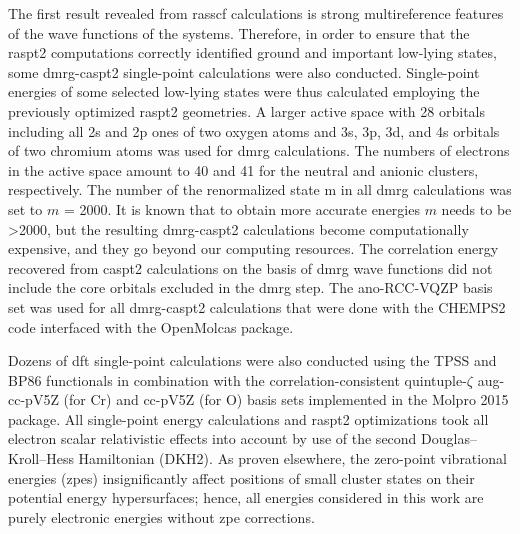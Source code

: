 \begin{refsection}
The first result revealed from \acrshort{rasscf} calculations is strong multireference features of the wave functions of the  systems. Therefore, in order to ensure that the \acrshort{raspt2} computations correctly identified ground and important low-lying states, some \acrshort{dmrg}-\acrshort{caspt2} \cite{dmrg1, dmrg2, dmrg3, dmrg4, dmrg5} single-point calculations were also conducted. Single-point energies of some selected low-lying states were thus calculated employing the previously optimized \acrshort{raspt2} geometries. A larger active space with 28 orbitals including all 2s and 2p ones of two oxygen atoms and 3s, 3p, 3d, and 4s orbitals of two chromium atoms was used for \acrshort{dmrg} calculations. The numbers of electrons in the active space amount to 40 and 41 for the neutral and anionic clusters, respectively. The number of the renormalized state m in all \acrshort{dmrg} calculations was set to $m$ = 2000. It is known that to obtain more accurate energies $m$ needs to be >2000, but the resulting \acrshort{dmrg}-\acrshort{caspt2} calculations become computationally expensive, and they go beyond our computing resources. The correlation energy recovered from \acrshort{caspt2} calculations on the basis of \acrshort{dmrg} wave functions did not include the core orbitals excluded in the \acrshort{dmrg} step. The \acrshort{ano}-RCC-VQZP basis set was used for all \acrshort{dmrg}-\acrshort{caspt2} calculations that were done with the CHEMPS2 code\cite{chemps2} interfaced with the OpenMolcas package.




Dozens of \acrshort{dft} single-point calculations were also conducted using the TPSS\cite{TPSS} and BP86 \cite{xbp86, cbp86} functionals in combination with the correlation-consistent quintuple-$\zeta$ aug-cc-pV5Z (for Cr)\cite{basis-Cr} and cc-pV5Z (for O)\cite{basis-O} basis sets implemented in the Molpro 2015 package.\cite{molpro2012} All single-point energy calculations and \acrshort{raspt2} optimizations took all electron scalar relativistic effects into account by use of the second Douglas–Kroll–Hess Hamiltonian (DKH2). \cite{DKH} As proven elsewhere, the zero-point vibrational energies (\acrshort{zpe}s) insignificantly affect positions of small cluster states on their potential energy hypersurfaces;\cite{ZPE} hence, all energies considered in this work are purely electronic energies without \acrshort{zpe} corrections.





\end{refsection}
